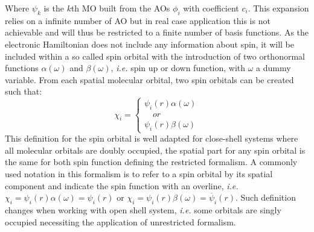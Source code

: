 \documentclass[12pt]{report}
\numberwithin{equation}{section}
\begin{document}
Where $\psi_k$ is the $k$th MO built from the AOs $\phi_i$ with coefficient $c_i$. 
This expansion relies on a infinite number of AO but in real case application this is not achievable and will thus be restricted to a finite number of basis functions.
As the electronic Hamiltonian does not include any information about spin, it will be included within a so called spin orbital with the introduction of two orthonormal functions $\alpha(\omega)$ and $\beta(\omega)$, \textit{i.e.} spin up or down function, with $\omega$ a dummy variable.
From each spatial molecular orbital, two spin orbitals can be created such that:
\begin{equation}
    \chi_i=\begin{cases}
    \psi_i(r)\alpha(\omega)\\
    \quad or \\
    \psi_i(r)\beta(\omega)
    \end{cases}
\end{equation}
This definition for the spin orbital is well adapted for close-shell systems where all molecular orbitals are doubly occupied, the spatial part for any spin orbital is the same for both spin function defining the restricted formalism.
A commonly used notation in this formalism is to refer to a spin orbital by its spatial component and indicate the spin function with an overline, \textit{i.e.} $\chi_i=\psi_i(r)\alpha(\omega)=\psi_i(r)$ or $\chi_i=\psi_i(r)\beta(\omega)=\overline{\psi}_i(r)$.
Such definition changes when working with open shell system, \textit{i.e.} some orbitals are singly occupied necessiting the application of unrestricted formalism.
\end{document}
